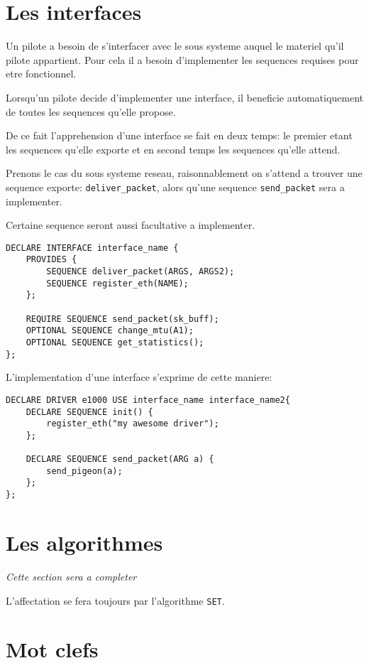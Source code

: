 \documentclass{rtxreport}
\begin{document}
\section{Les interfaces}

Un pilote a besoin de s'interfacer avec le sous systeme auquel le materiel qu'il pilote appartient.
Pour cela il a besoin d'implementer les sequences requises pour etre fonctionnel.

Lorsqu'un pilote decide d'implementer une interface, il beneficie automatiquement de toutes
les sequences qu'elle propose.

De ce fait l'apprehension d'une interface se fait en deux temps: le premier etant les sequences
qu'elle exporte et en second temps les sequences qu'elle attend.

Prenons le cas du sous systeme reseau, raisonnablement on s'attend a trouver une sequence exporte:
\texttt{deliver\_packet}, alors qu'une sequence \texttt{send\_packet} sera a implementer.

Certaine sequence seront aussi facultative a implementer.

\begin{lstlisting}[caption=Exemple de declaration d'une interface]
DECLARE INTERFACE interface_name {
	PROVIDES {
		SEQUENCE deliver_packet(ARGS, ARGS2);
		SEQUENCE register_eth(NAME);
	};

	REQUIRE SEQUENCE send_packet(sk_buff);
	OPTIONAL SEQUENCE change_mtu(A1);
	OPTIONAL SEQUENCE get_statistics();
};
\end{lstlisting}

L'implementation d'une interface s'exprime de cette maniere:

\begin{lstlisting}[caption=Utilisation d'une interface]
DECLARE DRIVER e1000 USE interface_name interface_name2{
	DECLARE SEQUENCE init() {
		register_eth("my awesome driver");
	};

	DECLARE SEQUENCE send_packet(ARG a) {
		send_pigeon(a);
	};
};
\end{lstlisting}


\section{Les algorithmes}
\emph{Cette section sera a completer}

L'affectation se fera toujours par l'algorithme \texttt{SET}.

\section{Mot clefs}
\end{document}
